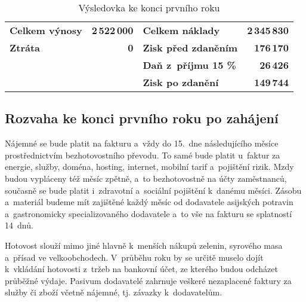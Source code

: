 \begin{table}[htbp]
\begin{center}
\begin{tabular}{lrlr}
\textbf{Celkem výnosy}\index{výnos} & \textbf{2\,522\,000}            & \textbf{Celkem náklady\index{náklad}}        & \textbf{2\,345\,830} \\
\textbf{Ztráta}        & \textbf{0}                    & \textbf{Zisk před zdaněním}    & \textbf{176\,170}   \\
                       &                               & \textbf{Daň z~příjmu 15 \%}    & \textbf{26\,426}    \\
                       &                               & \textbf{Zisk po zdanění}       & \textbf{149\,744}  
\end{tabular}
\caption{Výsledovka ke konci prvního roku}
\label{vysledovka}
\end{center}
\end{table}

\newpage

\subsection{Rozvaha ke konci prvního roku po zahájení}
Nájemné se bude platit na fakturu a~vždy do 15.~dne následujícího měsíce prostřednictvím bezhotovostního převodu. To samé bude platit u~faktur za energie, služby, doména, hosting, internet, mobilní tarif a~pojištění rizik. Mzdy budou vypláceny též měsíc zpětně, a~to bezhotovostně na účty zaměstnanců, současně se bude platit i~zdravotní a~sociální pojištění k~danému měsíci. Zásobu a~materiál budeme mít zajištěné každý měsíc od dodavatele asijských potravin a~gastronomicky specializovaného dodavatele a~to vše na fakturu se splatností 14~dnů. 

Hotovost slouží mimo jiné hlavně k~menších nákupů zelenin, syrového masa a~přísad ve velkoobchodech. V~průběhu roku by se určitě muselo dojít k~vkládání hotovosti z~tržeb na bankovní účet, ze kterého budou odcházet průběžné výdaje. Pasivum dodavatelé zahrnuje veškeré nezaplacené faktury za služby či zboží včetně nájemné, tj. závazky k~dodavatelům.

